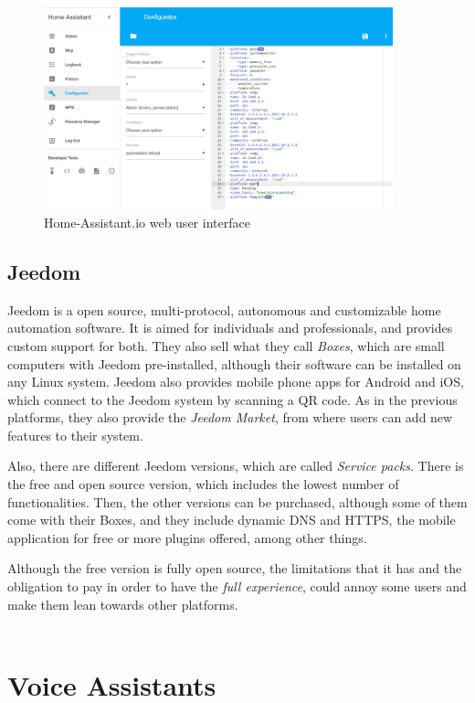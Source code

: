 \begin{figure}
	\centering
	\includegraphics[width=0.9\textwidth]{images/Chapter_04/home-assistant-configuration.png}
	\caption{Home-Assistant.io web user interface}
	\label{fig:home-assistant-configuration}
\end{figure}

\subsection{Jeedom}
Jeedom is a open source, multi-protocol, autonomous and customizable home automation software. It is aimed for individuals and
professionals, and provides custom support for both. They also sell what they call \textit{Boxes}, which are small computers with
Jeedom pre-installed, although their software can be installed on any Linux system. Jeedom also provides mobile phone apps for Android
and iOS, which connect to the Jeedom system by scanning a QR code. As in the previous platforms, they also provide the \textit{Jeedom Market},
from where users can add new features to their system.

Also, there are different Jeedom versions, which are called \textit{Service packs}. There is the free and open source version, which
includes the lowest number of functionalities. Then, the other versions can be purchased, although some of them come with their Boxes,
and they include dynamic DNS and HTTPS, the mobile application for free or more plugins offered, among other things.

Although the free version is fully open source, the limitations that it has and the obligation to pay in order to have the \textit{full 
experience}, could annoy some users and make them lean towards other platforms.
\\~\\



\section{Voice Assistants}


